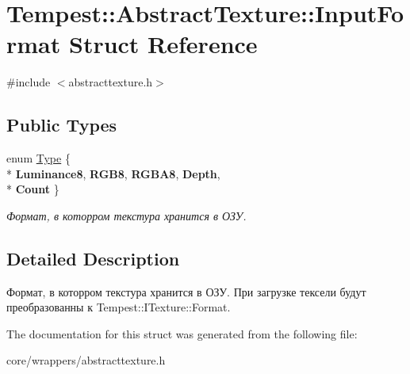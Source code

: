\hypertarget{struct_tempest_1_1_abstract_texture_1_1_input_format}{\section{Tempest\+:\+:Abstract\+Texture\+:\+:Input\+Format Struct Reference}
\label{struct_tempest_1_1_abstract_texture_1_1_input_format}
}


{\ttfamily \#include $<$abstracttexture.\+h$>$}

\subsection*{Public Types}
\begin{DoxyCompactItemize}
\item 
\hypertarget{struct_tempest_1_1_abstract_texture_1_1_input_format_a76bada4dfe78209969b1e3e232e34279}{enum \hyperlink{struct_tempest_1_1_abstract_texture_1_1_input_format_a76bada4dfe78209969b1e3e232e34279}{Type} \{ \\*
{\bfseries Luminance8}, 
{\bfseries R\+G\+B8}, 
{\bfseries R\+G\+B\+A8}, 
{\bfseries Depth}, 
\\*
{\bfseries Count}
 \}}\label{struct_tempest_1_1_abstract_texture_1_1_input_format_a76bada4dfe78209969b1e3e232e34279}

\begin{DoxyCompactList}\small\item\em Формат, в которром текстура хранится в ОЗУ. \end{DoxyCompactList}\end{DoxyCompactItemize}


\subsection{Detailed Description}
Формат, в которром текстура хранится в ОЗУ. При загрузке тексели будут преобразованны к Tempest\+::\+I\+Texture\+::\+Format. 

The documentation for this struct was generated from the following file\+:\begin{DoxyCompactItemize}
\item 
core/wrappers/abstracttexture.\+h\end{DoxyCompactItemize}
